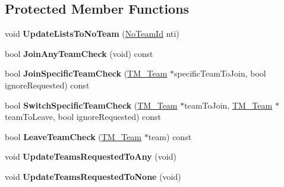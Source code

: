 \subsection*{Protected Member Functions}
\begin{DoxyCompactItemize}
\item 
\hypertarget{class_rak_net_1_1_t_m___team_member_adb5cf35573a66ab597dbff1dbf8eec7c}{void {\bfseries Update\-Lists\-To\-No\-Team} (\hyperlink{group___t_e_a_m___m_a_n_a_g_e_r___g_r_o_u_p_gadd1e99b7724ceb0f6794f46de31a6b02}{No\-Team\-Id} nti)}\label{class_rak_net_1_1_t_m___team_member_adb5cf35573a66ab597dbff1dbf8eec7c}

\item 
\hypertarget{class_rak_net_1_1_t_m___team_member_a6971cc0ad2bdbd63867f69b46a530b3e}{bool {\bfseries Join\-Any\-Team\-Check} (void) const }\label{class_rak_net_1_1_t_m___team_member_a6971cc0ad2bdbd63867f69b46a530b3e}

\item 
\hypertarget{class_rak_net_1_1_t_m___team_member_a9759aeb5ff3b6ebeaf40bb2d134251be}{bool {\bfseries Join\-Specific\-Team\-Check} (\hyperlink{class_rak_net_1_1_t_m___team}{T\-M\-\_\-\-Team} $\ast$specific\-Team\-To\-Join, bool ignore\-Requested) const }\label{class_rak_net_1_1_t_m___team_member_a9759aeb5ff3b6ebeaf40bb2d134251be}

\item 
\hypertarget{class_rak_net_1_1_t_m___team_member_acf4f2d376ed16b206822df7eb207bf28}{bool {\bfseries Switch\-Specific\-Team\-Check} (\hyperlink{class_rak_net_1_1_t_m___team}{T\-M\-\_\-\-Team} $\ast$team\-To\-Join, \hyperlink{class_rak_net_1_1_t_m___team}{T\-M\-\_\-\-Team} $\ast$team\-To\-Leave, bool ignore\-Requested) const }\label{class_rak_net_1_1_t_m___team_member_acf4f2d376ed16b206822df7eb207bf28}

\item 
\hypertarget{class_rak_net_1_1_t_m___team_member_aa7c08b104363aa8a1258e6b948fe067c}{bool {\bfseries Leave\-Team\-Check} (\hyperlink{class_rak_net_1_1_t_m___team}{T\-M\-\_\-\-Team} $\ast$team) const }\label{class_rak_net_1_1_t_m___team_member_aa7c08b104363aa8a1258e6b948fe067c}

\item 
\hypertarget{class_rak_net_1_1_t_m___team_member_ab8c715465d8479929adc8c8ad3ec881b}{void {\bfseries Update\-Teams\-Requested\-To\-Any} (void)}\label{class_rak_net_1_1_t_m___team_member_ab8c715465d8479929adc8c8ad3ec881b}

\item 
\hypertarget{class_rak_net_1_1_t_m___team_member_ad34c4cb489932a10f17de2ef0149fb6c}{void {\bfseries Update\-Teams\-Requested\-To\-None} (void)}\label{class_rak_net_1_1_t_m___team_member_ad34c4cb489932a10f17de2ef0149fb6c}


\end{DoxyCompactItemize}
